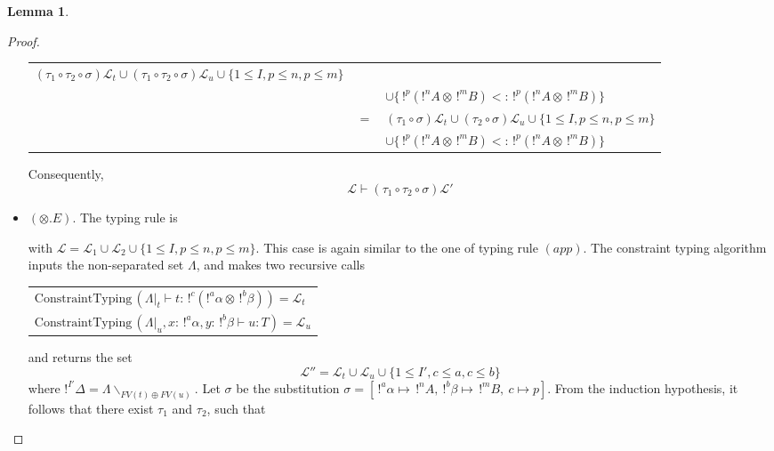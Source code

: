 \documentclass[9pt]{article}
\theoremstyle{plain}
\theoremstyle{definition}
\newtheorem{lemma}{Lemma}[section]
\newcommand{\pair}[2]{\langle #1, #2 \rangle}
\begin{document}
\begin{lemma}
\begin{proof}
\begin{itemize}
\begin{center}
\begin{tabular}{lcl}
				 			$(\tau_1 \circ \tau_2 \circ \sigma) \mathcal{L}_t \cup (\tau_1 \circ \tau_2 \circ \sigma) \mathcal{L}_u \cup
				 				\{1 \le I, p \le n, p \le m\}$ \\
				 	 	&& $\cup \{ \,!^p(!^nA \otimes \,!^mB) <: \,!^p(!^nA \otimes \,!^mB) \} $ \\
				 		& $=$ & $(\tau_1 \circ \sigma) \mathcal{L}_t \cup (\tau_2 \circ \sigma) \mathcal{L}_u \cup
				 				\{1 \le I, p \le n, p \le m\}$ \\
				 	 	&& $\cup \{ \,!^p(!^nA \otimes \,!^mB) <: \,!^p(!^nA \otimes \,!^mB) \} $
			 		\end{tabular}
			 		\end{center}
			 	Consequently,
			 		$$ \mathcal{L} \vdash (\tau_1 \circ \tau_2 \circ \sigma) \mathcal{L'} $$
			 		
			\item $(\otimes.E)$. The typing rule is
				\begin{prooftree}
					\BinaryInfC{$\Gamma_1, \Gamma_2, !^I\Delta \vdash_\mathcal{L} ~\text{let}~\pair{x}{y} = t ~\text{in}~ u : T$}
				\end{prooftree}
				with $\mathcal{L} = \mathcal{L}_1 \cup \mathcal{L}_2 \cup \{ 1 \le I, p \le n, p \le m \}$.
				This case is again similar to the one of typing rule $(app)$.
				The constraint typing algorithm inputs the non-separated set $\Lambda$, and makes two recursive calls
			 		\begin{center}
			 		\begin{tabular}{l}
			 			$\text{ConstraintTyping} \, (\Lambda |_t \vdash t : \, !^c(!^a\alpha \otimes \,!^b\beta)) = \mathcal{L}_t$ \\
			 			$\text{ConstraintTyping} \, (\Lambda |_u, x : \,!^a\alpha, y : \,!^b\beta \vdash u : T) = \mathcal{L}_u$
			 		\end{tabular}
			 		\end{center}
			 	and returns the set
			 		$$ \mathcal{L''} = \mathcal{L}_t \cup \mathcal{L}_u \cup \{ 1 \le I', c \le a, c \le b \} $$
			 	where $!^{I'} \Delta = \Lambda \backslash_{FV(t) \oplus FV(u)}$.
			 	Let $\sigma$ be the substitution $\sigma = [\, !^a\alpha \mapsto \,!^nA, ~!^b\beta \mapsto \,!^mB, ~ c \mapsto p ]$.
			 	From the induction hypothesis, it follows that there exist $\tau_1$ and $\tau_2$, such that
			 		\begin{center}

\end{center}
\end{itemize}
\end{proof}
\end{lemma}
\end{document}

